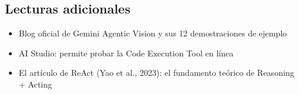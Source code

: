 \documentclass[a4paper]{article}
\begin{document}
\subsection{Lecturas adicionales}

\begin{itemize}
    \item Blog oficial de Gemini Agentic Vision y sus 12 demostraciones de ejemplo
    \item AI Studio: permite probar la Code Execution Tool en línea
    \item El artículo de ReAct (Yao et al., 2023): el fundamento teórico de Reasoning + Acting
\end{itemize}

\end{document}
